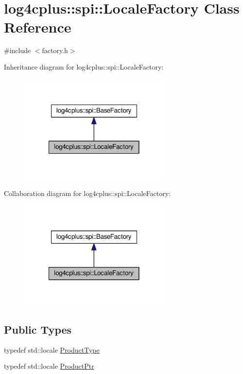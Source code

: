 \hypertarget{classlog4cplus_1_1spi_1_1LocaleFactory}{\section{log4cplus\-:\-:spi\-:\-:Locale\-Factory Class Reference}
\label{classlog4cplus_1_1spi_1_1LocaleFactory}
}


{\ttfamily \#include $<$factory.\-h$>$}



Inheritance diagram for log4cplus\-:\-:spi\-:\-:Locale\-Factory\-:
\nopagebreak
\begin{figure}[H]
\begin{center}
\leavevmode
\includegraphics[width=218pt]{classlog4cplus_1_1spi_1_1LocaleFactory__inherit__graph}
\end{center}
\end{figure}


Collaboration diagram for log4cplus\-:\-:spi\-:\-:Locale\-Factory\-:
\nopagebreak
\begin{figure}[H]
\begin{center}
\leavevmode
\includegraphics[width=218pt]{classlog4cplus_1_1spi_1_1LocaleFactory__coll__graph}
\end{center}
\end{figure}
\subsection*{Public Types}
\begin{DoxyCompactItemize}
\item 
typedef std\-::locale \hyperlink{classlog4cplus_1_1spi_1_1LocaleFactory_ae07f0f49c136b8930f8f398c454fff74}{Product\-Type}
\item 
typedef std\-::locale \hyperlink{classlog4cplus_1_1spi_1_1LocaleFactory_addc3507088f239b580e4c7691b67919f}{Product\-Ptr}
\end{DoxyCompactItemize}
